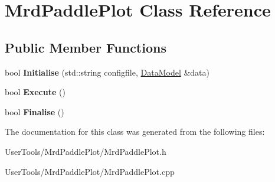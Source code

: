 \hypertarget{classMrdPaddlePlot}{
\section{MrdPaddlePlot Class Reference}
\label{classMrdPaddlePlot}
}
\subsection*{Public Member Functions}
\begin{DoxyCompactItemize}
\item 
\hypertarget{classMrdPaddlePlot_a17a420342671b900521987f9dc070985}{
bool {\bfseries Initialise} (std::string configfile, \hyperlink{classDataModel}{DataModel} \&data)}
\label{classMrdPaddlePlot_a17a420342671b900521987f9dc070985}

\item 
\hypertarget{classMrdPaddlePlot_a655db67bffdbd48ef56a928bb84be1c2}{
bool {\bfseries Execute} ()}
\label{classMrdPaddlePlot_a655db67bffdbd48ef56a928bb84be1c2}

\item 
\hypertarget{classMrdPaddlePlot_ada0f5bfebebcd67b1da1f9db55fb13bc}{
bool {\bfseries Finalise} ()}
\label{classMrdPaddlePlot_ada0f5bfebebcd67b1da1f9db55fb13bc}

\end{DoxyCompactItemize}


The documentation for this class was generated from the following files:\begin{DoxyCompactItemize}
\item 
UserTools/MrdPaddlePlot/MrdPaddlePlot.h\item 
UserTools/MrdPaddlePlot/MrdPaddlePlot.cpp\end{DoxyCompactItemize}
